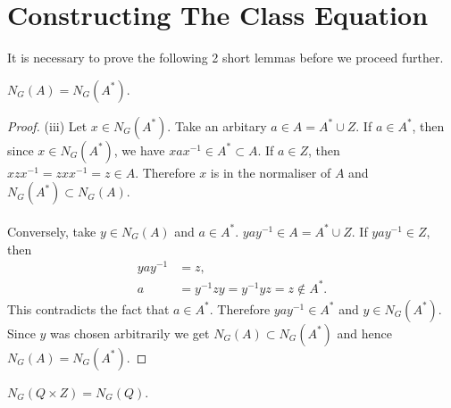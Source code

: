 \section{Constructing The Class Equation}

It is necessary to prove the following 2 short lemmas before we proceed further.
 
\begin{lemma}\label{unsureifneeded} $N_G(A) =N_G(A^*)$.
\end{lemma}

\begin{proof}
(iii) Let $x \in N_G(A^*)$. Take an arbitary $a \in A = A^* \cup Z$. If $a \in A^*$, then since  $x \in N_G(A^*)$, we have $xax^{-1} \in A^* \subset A$. If $a \in Z$, then $xzx^{-1} = zxx^{-1} = z \in A$. Therefore $x$ is in the normaliser of $A$ and $N_G(A^*) \subset N_G(A)$. \\
\\
Conversely, take $y \in N_G(A)$ and $a \in A^*$. $yay^{-1} \in A = A^* \cup Z$. If  $yay^{-1} \in Z$, then
\begin{align*} yay^{-1} &= z, \tag{some $z \in Z$}
\\ a &= y^{-1}zy =   y^{-1}yz = z \not \in A^*.
\end{align*}
This contradicts the fact that $a \in A^*$. Therefore $yay^{-1} \in A^*$ and $y \in N_G(A^*)$. Since $y$ was chosen arbitrarily we get $N_G(A) \subset N_G(A^*)$ and hence $N_G(A) =N_G(A^*)$.

\end{proof}

\begin{lemma}\label{unsure} $N_G(Q \times Z) = N_G(Q)$.
\end{lemma}


